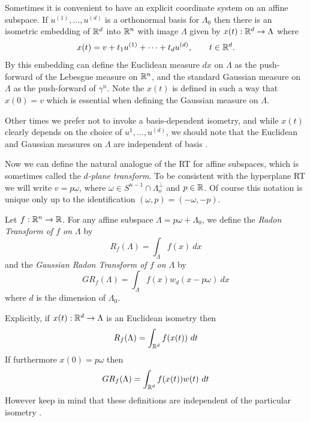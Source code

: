 Sometimes it is convenient to have an explicit coordinate system on an affine subspace. If $u^{(1)}, \ldots, u^{(d)}$ is a orthonormal basis for $\Lambda_0$ then there is an isometric embedding of $\mathbb{R}^d$ into $\mathbb{R}^n$ with image $\Lambda$ given by $x(t) : \mathbb{R}^d \rightarrow \Lambda$ where
\[
  x(t) = v + t_1u^{(1)} + \cdots + t_d u^{(d)}, \qquad t \in \mathbb{R}^d.
\]
By this embedding can define the Euclidean measure $dx$ on $\Lambda$ as the push-forward of the Lebesgue measure on $\mathbb{R}^n$, and the standard Gaussian measure on $\Lambda$ as the push-forward of $\gamma^n$. Note the $x(t)$ is defined in such a way that $x(0) = v$ which is essential when defining the Gaussian measure on $\Lambda$.

Other times we prefer not to invoke a basis-dependent isometry, and while $x(t)$ clearly depends on the choice of $u^{1}, \ldots, u^{(d)}$, we should note that the Euclidean and Gaussian measures on $\Lambda$ are independent of basis \pn.


Now we can define the natural analogue of the RT for affine subspaces, which is sometimes called the \emph{$d$-plane transform}. To be consistent with the hyperplane RT we will write $v = p\omega$, where $\omega \in S^{n-1} \cap \Lambda_o^\perp$ and $p \in \mathbb{R}$. Of course this notation is unique only up to the identification $(\omega, p) = (-\omega, -p)$.

\begin{definition}
  Let $f:\mathbb{R}^n \rightarrow \mathbb{R}$. For any affine subspace $\Lambda = p\omega + \Lambda_0$, we define the \emph{Radon Transform of $f$ on $\Lambda$} by
  \[
    R_f(\Lambda) = \int_{\Lambda} f(x)~dx
  \]
  and the \emph{Gaussian Radon Transform of $f$ on $\Lambda$} by 
  \[
    GR_f(\Lambda) = \int_{\Lambda} f(x) w_d(x - p\omega) ~dx
  \]
  where $d$ is the dimension of $\Lambda_0$.
\end{definition}
\begin{remark}
  Explicitly, if $x(t): \mathbb{R}^d \rightarrow \Lambda$ is an Euclidean isometry then 
  \[
    R_f(\Lambda) = \int_{\mathbb{R}^d} f(x(t))~dt
  \]
  If furthermore $x(0) = p\omega$ then
  \[
    GR_f(\Lambda) = \int_{\mathbb{R}^d} f(x(t))w(t)~dt
  \]
  However keep in mind that these definitions are independent of the particular isometry \pn.
\end{remark}


